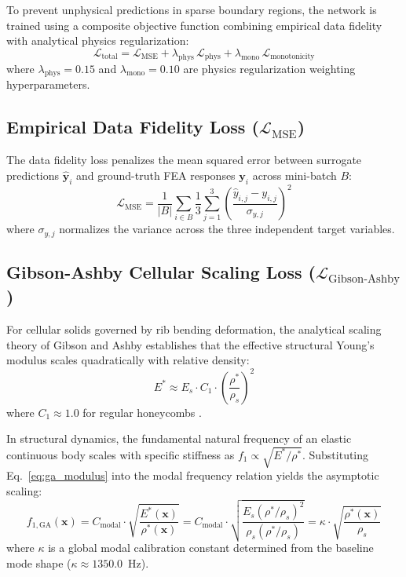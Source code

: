 \documentclass[preprint,12pt,3p]{elsarticle}
\begin{document}
To prevent unphysical predictions in sparse boundary regions, the network is trained using a composite objective function combining empirical data fidelity with analytical physics regularization:
\begin{equation}
  \mathcal{L}_{\text{total}} = \mathcal{L}_{\text{MSE}} + \lambda_{\text{phys}}\,\mathcal{L}_{\text{phys}} + \lambda_{\text{mono}}\,\mathcal{L}_{\text{monotonicity}}
  \label{eq:loss_total}
\end{equation}
where $\lambda_{\text{phys}} = 0.15$ and $\lambda_{\text{mono}} = 0.10$ are physics regularization weighting hyperparameters.

\subsection{Empirical Data Fidelity Loss ($\mathcal{L}_{\text{MSE}}$)}
The data fidelity loss penalizes the mean squared error between surrogate predictions $\hat{\mathbf{y}}_i$ and ground-truth FEA responses $\mathbf{y}_i$ across mini-batch $B$:
\begin{equation}
  \mathcal{L}_{\text{MSE}} = \frac{1}{|B|} \sum_{i \in B} \frac{1}{3} \sum_{j=1}^{3} \left( \frac{\hat{y}_{i,j} - y_{i,j}}{\sigma_{y,j}} \right)^2
  \label{eq:loss_mse}
\end{equation}
where $\sigma_{y,j}$ normalizes the variance across the three independent target variables.

\subsection{Gibson-Ashby Cellular Scaling Loss ($\mathcal{L}_{\text{Gibson-Ashby}}$)}
For cellular solids governed by rib bending deformation, the analytical scaling theory of Gibson and Ashby \cite{gibson1997} establishes that the effective structural Young's modulus scales quadratically with relative density:
\begin{equation}
  E^* \approx E_s \cdot C_1 \cdot \left( \frac{\rho^*}{\rho_s} \right)^2
  \label{eq:ga_modulus}
\end{equation}
where $C_1 \approx 1.0$ for regular honeycombs \cite{beigrezaee2026}. 

In structural dynamics, the fundamental natural frequency of an elastic continuous body scales with specific stiffness as $f_1 \propto \sqrt{E^* / \rho^*}$. Substituting Eq.~\eqref{eq:ga_modulus} into the modal frequency relation yields the asymptotic scaling:
\begin{equation}
  f_{1,\text{GA}}(\mathbf{x}) = C_{\text{modal}} \cdot \sqrt{\frac{E^*(\mathbf{x})}{\rho^*(\mathbf{x})}} = C_{\text{modal}} \cdot \sqrt{\frac{E_s \left( \rho^*/\rho_s \right)^2}{\rho_s \left( \rho^*/\rho_s \right)}} = \kappa \cdot \sqrt{\frac{\rho^*(\mathbf{x})}{\rho_s}}
  \label{eq:ga_frequency}
\end{equation}
where $\kappa$ is a global modal calibration constant determined from the baseline mode shape ($\kappa \approx 1350.0$~Hz).
\end{document}
